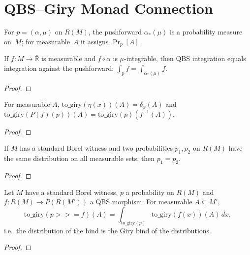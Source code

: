\section{QBS--Giry Monad Connection}\label{sec:giry_connection}

\begin{definition}\label{def:to_giry}
  \rocqok
  For $p = (\alpha, \mu)$ on $R(M)$, the pushforward
  $\alpha_*(\mu)$ is a probability measure on~$M$; for measurable~$A$ it
  assigns $\Pr_p[A]$.
\end{definition}

\begin{lemma}\label{thm:qbs_integral_giry}
  \rocqok
  If $f : M \to \bar{\mathbb{R}}$ is measurable and $f \circ \alpha$ is
  $\mu$-integrable, then QBS integration equals integration against the
  pushforward: $\int_p f = \int_{\alpha_*(\mu)} f$.
\end{lemma}
\begin{proof}\rocqok\end{proof}

\begin{lemma}\label{lem:to_giry_return}
  \rocqok
  For measurable $A$, $\mathrm{to\_giry}(\eta(x))(A) = \delta_x(A)$ and
  $\mathrm{to\_giry}(P(f)(p))(A) = \mathrm{to\_giry}(p)(f^{-1}(A))$.
\end{lemma}
\begin{proof}\rocqok\end{proof}

\begin{theorem}\label{thm:to_giry_inj}
  \rocqok
  If $M$ has a standard Borel witness and two probabilities $p_1, p_2$ on
  $R(M)$ have the same distribution on all measurable sets, then
  $p_1 = p_2$.
\end{theorem}
\begin{proof}\rocqok\end{proof}

\begin{theorem}\label{thm:to_giry_bind}
  \rocqok
  Let $M$ have a standard Borel witness, $p$ a probability on $R(M)$ and
  $f : R(M) \to P(R(M'))$ a QBS morphism. For measurable $A \subseteq M'$,
  \[
    \mathrm{to\_giry}(p \mathbin{>\!\!>\!\!=} f)(A) =
    \int_{\mathrm{to\_giry}(p)} \mathrm{to\_giry}(f(x))(A)\,dx,
  \]
  i.e.\ the distribution of the bind is the Giry bind of the distributions.
\end{theorem}
\begin{proof}\rocqok\end{proof}


